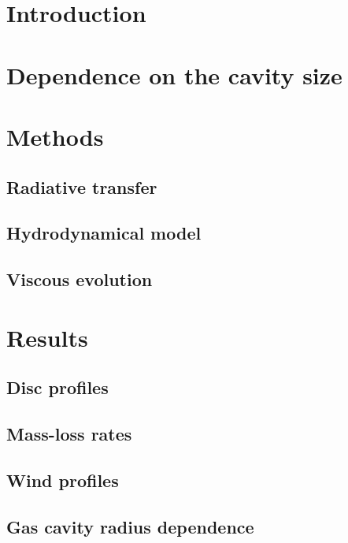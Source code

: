 \documentclass{aa}
\begin{document}
   \section{Introduction} \label{sec:intro}

   

   \section{Dependence on the cavity size}\label{sec:cavity}

   \section{Methods}\label{sec:methods}

      \subsection{Radiative transfer}

      \subsection{Hydrodynamical model}\label{sec:hydro-model}

      \subsection{Viscous evolution}

   \section{Results}\label{sec:results}

      \subsection{Disc profiles}

      \subsection{Mass-loss rates}\label{sec:mdot}

      \subsection{Wind profiles}\label{sec:wind-prof}

      \subsection{Gas cavity radius dependence}\label{sec:gap-dependance}
\end{document}
